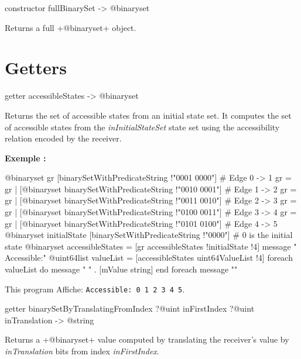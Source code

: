 \begin{galgas3box}
constructor fullBinarySet -> @binaryset
\end{galgas3box}

Returns a full \ggst+@binaryset+ object.


\section{Getters}




\begin{galgas3box}
getter accessibleStates -> @binaryset
\end{galgas3box}

Returns the set of accessible states from an initial state set. It computes the set of accessible states from the \emph{inInitialStateSet} state set using the accessibility relation encoded by the receiver.

\textbf{Exemple :}
\begin{galgas3}
@binaryset gr [binarySetWithPredicateString !"0001 0000"] # Edge 0 -> 1
gr = gr | [@binaryset binarySetWithPredicateString !"0010 0001"] # Edge 1 -> 2
gr = gr | [@binaryset binarySetWithPredicateString !"0011 0010"] # Edge 2 -> 3
gr = gr | [@binaryset binarySetWithPredicateString !"0100 0011"] # Edge 3 -> 4
gr = gr | [@binaryset binarySetWithPredicateString !"0101 0100"] # Edge 4 -> 5
@binaryset initialState [binarySetWithPredicateString !"0000"] # 0 is the initial state
@binaryset accessibleStates = [gr accessibleStates !initialState !4]
message " Accessible:"
@uint64list valueList = [accessibleStates uint64ValueList !4]
foreach valueList do
  message " " . [mValue string]
end foreach
message "\n"
\end{galgas3}


This program Affiche: \texttt{Accessible: 0 1 2 3 4 5}.




\begin{galgas3box}
getter binarySetByTranslatingFromIndex ?@uint inFirstIndex ?@uint inTranslation -> @string
\end{galgas3box}


Returns a \ggst+@binaryset+ value computed by translating the receiver's value by \emph{inTranslation} bits from index \emph{inFirstIndex}.



